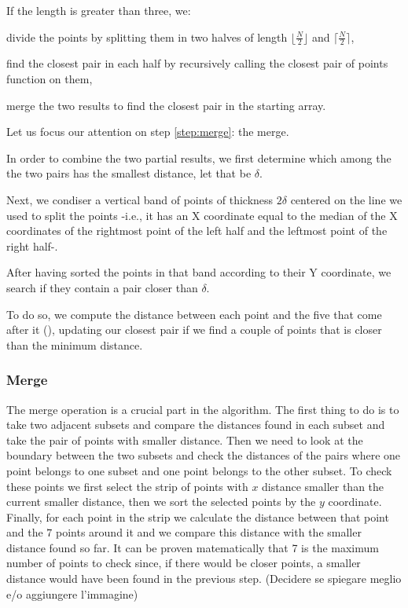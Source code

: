 If the length is greater than three, we:
\begin{inlinelist}
    \item divide the points by splitting them in two halves of length $\lfloor \frac{N}{2} \rfloor$ and $\lceil \frac{N}{2} \rceil$,
    \item find the closest pair in each half by recursively calling the closest pair of points function on them,
    \item merge the two results to find the closest pair in the starting array. \label{step:merge}
\end{inlinelist}

Let us focus our attention on step \ref{step:merge}: the merge.

In order to combine the two partial results, we first determine which among the the two pairs has the smallest distance, let that be $\delta$.

Next, we condiser a vertical band of points of thickness $2\delta$ centered on the line we used to split the points -i.e., it has an X coordinate equal to the median of the X coordinates of the rightmost point of the left half and the leftmost point of the right half-.

After having sorted the points in that band according to their Y coordinate, we search if they contain a pair closer than $\delta$.

To do so, we compute the distance between each point and the five that come after it (), updating our closest pair if we find a couple of points that is closer than the minimum distance.

\subsubsection{Merge}
The merge operation is a crucial part in the algorithm.
The first thing to do is to take two adjacent subsets and compare the distances
found in each subset and take the pair of points with smaller distance. Then we
need to look at the boundary between the two subsets and check the distances of
the pairs where one point belongs to one subset and one point belongs to the other
subset. To check these points we first select the strip of points with $x$ distance smaller
than the current smaller distance, then we sort the selected points by the $y$ coordinate.
Finally, for each point in the strip we calculate the distance between that point and
the $7$ points around it and we compare this distance with the smaller distance found so far.
It can be proven matematically that 7 is the maximum number of points to check since, if there
would be closer points, a smaller distance would have been found in the previous step.
(Decidere se spiegare meglio e/o aggiungere l'immagine)

